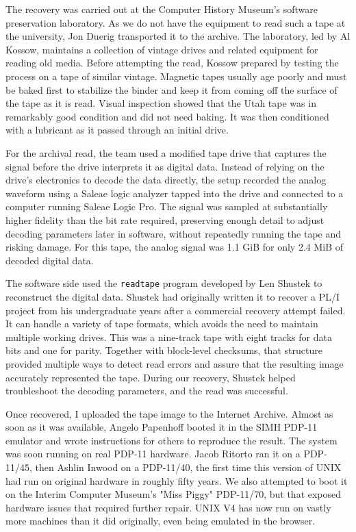 The recovery was carried out at the Computer History Museum's software preservation laboratory.
As we do not have the equipment to read such a tape at the university, Jon Duerig transported it to the archive.
The laboratory, led by Al Kossow, maintains a collection of vintage drives and related equipment for reading old media.
Before attempting the read, Kossow prepared by testing the process on a tape of similar vintage.
Magnetic tapes usually age poorly and must be baked first to stabilize the binder and keep it from coming off the surface of the tape as it is read.
Visual inspection showed that the Utah tape was in remarkably good condition and did not need baking.
It was then conditioned with a lubricant as it passed through an initial drive.

For the archival read, the team used a modified tape drive that captures the signal before the drive interprets it as digital data.
Instead of relying on the drive's electronics to decode the data directly, the setup recorded the analog waveform using a Saleae logic analyzer tapped into the drive and connected to a computer running Saleae Logic Pro.
The signal was sampled at substantially higher fidelity than the bit rate required, preserving enough detail to adjust decoding parameters later in software, without repeatedly running the tape and risking damage.
For this tape, the analog signal was 1.1 GiB for only 2.4 MiB of decoded digital data.

The software side used the \texttt{readtape} program developed by Len Shustek to reconstruct the digital data.
Shustek had originally written it to recover a PL/I project from his undergraduate years after a commercial recovery attempt failed.
It can handle a variety of tape formats, which avoids the need to maintain multiple working drives.
This was a nine-track tape with eight tracks for data bits and one for parity.
Together with block-level checksums, that structure provided multiple ways to detect read errors and assure that the resulting image accurately represented the tape.
During our recovery, Shustek helped troubleshoot the decoding parameters, and the read was successful.

Once recovered, I uploaded the tape image to the Internet Archive.
Almost as soon as it was available, Angelo Papenhoff booted it in the SIMH PDP-11 emulator and wrote instructions for others to reproduce the result.
The system was soon running on real PDP-11 hardware.
Jacob Ritorto ran it on a PDP-11/45, then Ashlin Inwood on a PDP-11/40, the first time this version of UNIX had run on original hardware in roughly fifty years.
We also attempted to boot it on the Interim Computer Museum's "Miss Piggy" PDP-11/70, but that exposed hardware issues that required further repair.
UNIX V4 has now run on vastly more machines than it did originally, even being emulated in the browser.

